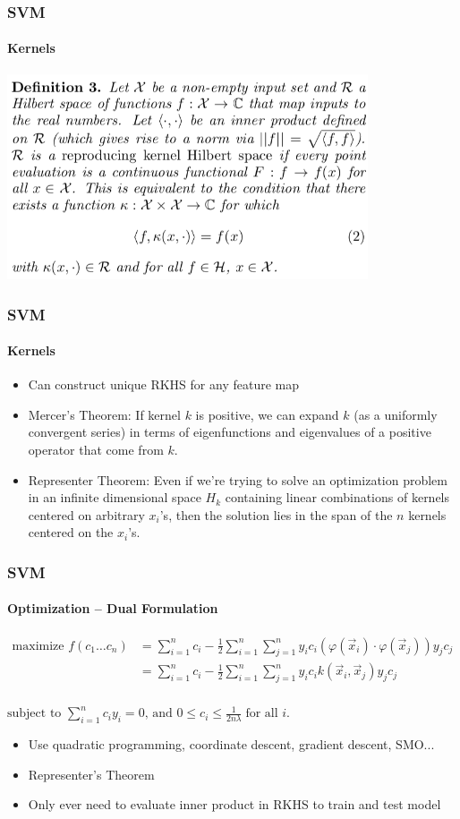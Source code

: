 \documentclass{beamer}
\newcommand\0{\mathbf{0}}
\begin{document}
  \begin{frame}
  	\frametitle{SVM}
  	\framesubtitle{Kernels}
  	\includegraphics[width=0.8\textwidth]{kernel_dfn_4.png}
  \end{frame}
	\frametitle{SVM}
  	\framesubtitle{Kernels}
	\begin{frame}
	\begin{itemize}
	\item Can construct unique RKHS for any feature map
	\item Mercer's Theorem: If kernel $k$ is positive, we can expand $k$ (as a uniformly convergent series) in terms of eigenfunctions and eigenvalues of a positive operator that come from $k$.	
	\item Representer Theorem: Even if we’re trying to solve an optimization problem in an infinite dimensional space $H_k$ containing linear combinations of kernels centered on arbitrary $x_i$'s, then the solution lies in the span of the $n$ kernels centered on the $x_i$’s.
	\end{itemize}
	
	\end{frame}

	\begin{frame}
	\frametitle{SVM}
  	\framesubtitle{Optimization -- Dual Formulation}
  	
  	${\displaystyle {\begin{aligned}{\text{maximize}}\,\,f(c_{1}\ldots c_{n})&=\sum _{i=1}^{n}c_{i}-{\frac {1}{2}}\sum _{i=1}^{n}\sum _{j=1}^{n}y_{i}c_{i}(\varphi ({\vec {x}}_{i})\cdot \varphi ({\vec {x}}_{j}))y_{j}c_{j}\\&=\sum _{i=1}^{n}c_{i}-{\frac {1}{2}}\sum _{i=1}^{n}\sum _{j=1}^{n}y_{i}c_{i}k({\vec {x}}_{i},{\vec {x}}_{j})y_{j}c_{j}\\\end{aligned}}}$

	${\displaystyle {\text{subject to }}\sum _{i=1}^{n}c_{i}y_{i}=0,\,{\text{and }}0\leq c_{i}\leq {\frac {1}{2n\lambda }}\;{\text{for all }}i.}$
	
	\begin{itemize}
	\item Use quadratic programming, coordinate descent, gradient descent, SMO...
	\item Representer's Theorem
	\item Only ever need to evaluate inner product in RKHS to train and 	test model
	\end{itemize}

  	\end{frame}
  	
\end{document}

